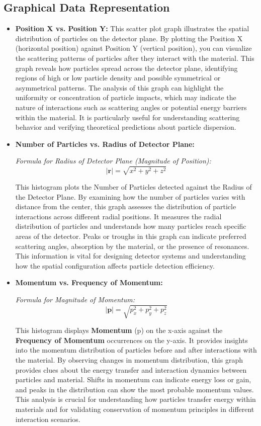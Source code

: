 \documentclass{article}
\begin{document}
\subsection{Graphical Data Representation}
\begin{itemize}
    \item \textbf{Position X vs. Position Y:} This scatter plot graph illustrates the spatial distribution of particles on the detector plane. By plotting the Position X (horizontal position) against Position Y (vertical position), you can visualize the scattering patterns of particles after they interact with the material. This graph reveals how particles spread across the detector plane, identifying regions of high or low particle density and possible symmetrical or asymmetrical patterns. The analysis of this graph can highlight the uniformity or concentration of particle impacts, which may indicate the nature of interactions such as scattering angles or potential energy barriers within the material. It is particularly useful for understanding scattering behavior and verifying theoretical predictions about particle dispersion.

    \item \textbf{Number of Particles vs. Radius of Detector Plane:} 

\textit{Formula for Radius of Detector Plane (Magnitude of Position):}
\[
|\mathbf{r}| = \sqrt{x^2 + y^2 + z^2}
\]

    
    This histogram plots the Number of Particles detected against the Radius of the Detector Plane. By examining how the number of particles varies with distance from the center, this graph assesses the distribution of particle interactions across different radial positions. It measures the radial distribution of particles and understands how many particles reach specific areas of the detector. Peaks or troughs in this graph can indicate preferred scattering angles, absorption by the material, or the presence of resonances. This information is vital for designing detector systems and understanding how the spatial configuration affects particle detection efficiency.

    \item \textbf{Momentum vs. Frequency of Momentum:} 

\textit{Formula for Magnitude of Momentum:}
\[
|\mathbf{p}| = \sqrt{p_x^2 + p_y^2 + p_z^2}
\]
    
    This histogram displays \textbf{Momentum} (p) on the x-axis against the \textbf{Frequency of Momentum} occurrences on the y-axis. It provides insights into the momentum distribution of particles before and after interactions with the material. By observing changes in momentum distribution, this graph provides clues about the energy transfer and interaction dynamics between particles and material. Shifts in momentum can indicate energy loss or gain, and peaks in the distribution can show the most probable momentum values. This analysis is crucial for understanding how particles transfer energy within materials and for validating conservation of momentum principles in different interaction scenarios.

\end{itemize}
\end{document}

